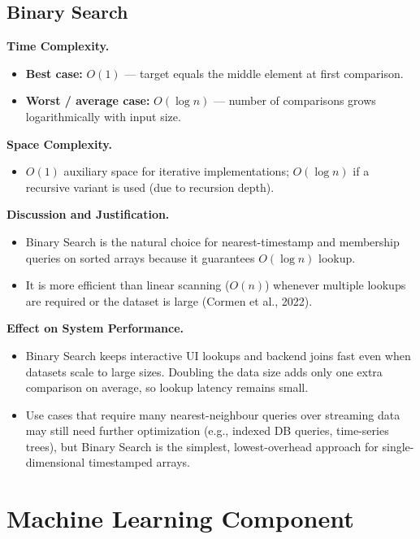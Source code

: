 \documentclass[12pt]{article}
\begin{document}
\subsection{Binary Search}

\noindent\textbf{Time Complexity.}
\begin{itemize}
    \item \textbf{Best case:} $O(1)$ --- target equals the middle element at first comparison.
    \item \textbf{Worst / average case:} $O(\log n)$ --- number of comparisons grows logarithmically with input size.
\end{itemize}

\noindent\textbf{Space Complexity.}
\begin{itemize}
    \item $O(1)$ auxiliary space for iterative implementations; $O(\log n)$ if a recursive variant is used (due to recursion depth).
\end{itemize}

\noindent\textbf{Discussion and Justification.}
\begin{itemize}
    \item Binary Search is the natural choice for nearest-timestamp and membership queries on sorted arrays because it guarantees $O(\log n)$ lookup.
    \item It is more efficient than linear scanning ($O(n)$) whenever multiple lookups are required or the dataset is large (Cormen et al., 2022).
\end{itemize}

\noindent\textbf{Effect on System Performance.}
\begin{itemize}
    \item Binary Search keeps interactive UI lookups and backend joins fast even when datasets scale to large sizes. Doubling the data size adds only one extra comparison on average, so lookup latency remains small.
    \item Use cases that require many nearest-neighbour queries over streaming data may still need further optimization (e.g., indexed DB queries, time-series trees), but Binary Search is the simplest, lowest-overhead approach for single-dimensional timestamped arrays.
\end{itemize}

\section{Machine Learning Component}
\end{document}
